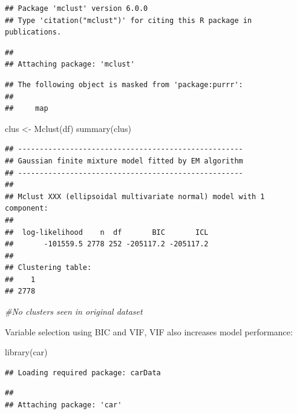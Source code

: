 \documentclass[
]{article}
\newenvironment{Shaded}{\begin{snugshade}}{\end{snugshade}}
\newcommand{\CommentTok}[1]{\textcolor[rgb]{0.56,0.35,0.01}{\textit{#1}}}
\newcommand{\FunctionTok}[1]{\textcolor[rgb]{0.00,0.00,0.00}{#1}}
\newcommand{\NormalTok}[1]{#1}
\newcommand{\OtherTok}[1]{\textcolor[rgb]{0.56,0.35,0.01}{#1}}
\begin{document}
\begin{verbatim}
## Package 'mclust' version 6.0.0
## Type 'citation("mclust")' for citing this R package in publications.
\end{verbatim}

\begin{verbatim}
## 
## Attaching package: 'mclust'
\end{verbatim}

\begin{verbatim}
## The following object is masked from 'package:purrr':
## 
##     map
\end{verbatim}

\begin{Shaded}
\begin{Highlighting}[]
\NormalTok{clus }\OtherTok{\textless{}{-}} \FunctionTok{Mclust}\NormalTok{(df)}
\FunctionTok{summary}\NormalTok{(clus)}
\end{Highlighting}
\end{Shaded}

\begin{verbatim}
## ---------------------------------------------------- 
## Gaussian finite mixture model fitted by EM algorithm 
## ---------------------------------------------------- 
## 
## Mclust XXX (ellipsoidal multivariate normal) model with 1 component: 
## 
##  log-likelihood    n  df       BIC       ICL
##       -101559.5 2778 252 -205117.2 -205117.2
## 
## Clustering table:
##    1 
## 2778
\end{verbatim}

\begin{Shaded}
\begin{Highlighting}[]
\CommentTok{\#No clusters seen in original dataset}
\end{Highlighting}
\end{Shaded}

Variable selection using BIC and VIF, VIF also increases model
performance:

\begin{Shaded}
\begin{Highlighting}[]
\FunctionTok{library}\NormalTok{(car)}
\end{Highlighting}
\end{Shaded}

\begin{verbatim}
## Loading required package: carData
\end{verbatim}

\begin{verbatim}
## 
## Attaching package: 'car'
\end{verbatim}
\end{document}

